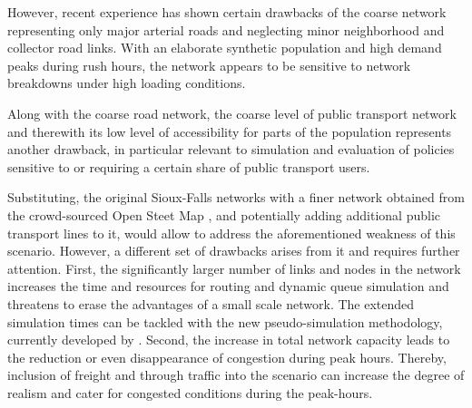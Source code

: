 However, recent experience has shown certain drawbacks of the coarse network representing only major arterial roads and neglecting minor neighborhood and collector road links. With an elaborate synthetic population and high demand peaks during rush hours, the network appears to be sensitive to network breakdowns under high loading conditions. 

Along with the coarse road network, the coarse level of public transport network and therewith its low level of accessibility for parts of the population represents another drawback, in particular relevant to simulation and evaluation of policies sensitive to or requiring a certain share of public transport users. 

Substituting, the original Sioux-Falls networks with a finer network obtained from the crowd-sourced Open Steet Map \cite[][]{OpenStreetMap_Webpage_2015}, and potentially adding additional public transport lines to it, would allow to address the aforementioned weakness of this scenario. However, a different set of drawbacks arises from it and requires further attention. First, the significantly larger number of links and nodes in the network increases the time and resources for routing and dynamic queue simulation and threatens to erase the advantages of a small scale network. The extended simulation times can be tackled with the new pseudo-simulation methodology, currently developed by \citet[][]{FourieEtAl_TRR_2013}.
Second, the increase in total network capacity leads to the reduction or even disappearance of congestion during peak hours. Thereby, inclusion of freight and through traffic into the scenario can increase the degree of realism and cater for congested conditions during the peak-hours. 


